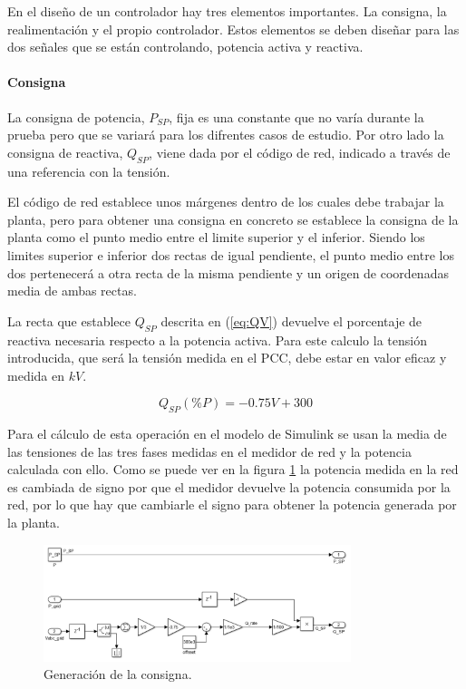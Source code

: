 \documentclass{book}
\begin{document}
En el diseño de un controlador hay tres elementos importantes. La consigna, la realimentaci\'on y el propio controlador. Estos elementos se deben diseñar para las dos señales que se est\'an controlando, potencia activa y reactiva. \par

		\paragraph{Consigna}

La consigna de potencia, $P_{SP}$, fija es una constante que no var\'ia durante la prueba pero que se variar\'a para los difrentes casos de estudio. Por otro lado la consigna de reactiva, $Q_{SP}$, viene dada por el c\'odigo de red, indicado a trav\'es de una referencia con la tensi\'on. \par

El c\'odigo de red establece unos m\'argenes dentro de los cuales debe trabajar la planta, pero para obtener una consigna en concreto se establece la consigna de la planta como el punto medio entre el limite superior y el inferior. Siendo los limites superior e inferior dos rectas de igual pendiente, el punto medio entre los dos pertenecer\'a a otra recta de la misma pendiente y un origen de coordenadas media de ambas rectas. \par

La recta que establece $Q_{SP}$ descrita en (\ref{eq:QV}) devuelve el porcentaje de reactiva necesaria respecto a la potencia activa. Para este calculo la tensi\'on introducida, que ser\'a la tensi\'on medida en el PCC, debe estar en valor eficaz y medida en $kV$.  

\begin{equation}\label{eq:QV}
	Q_{SP}(\%P)= -0.75V +300 
\end{equation} \par

Para el c\'alculo de esta operaci\'on en el modelo de Simulink se usan la media de las tensiones de las tres fases medidas en el medidor de red y la potencia calculada con ello. Como se puede ver en la figura \ref{SP_Sim} la potencia medida en la red es cambiada de signo por que el medidor devuelve la potencia consumida por la red, por lo que hay que cambiarle el signo para obtener la potencia generada por la planta. 

\begin{figure}[h!]
\centering
\includegraphics[width=0.8\textwidth]{SP_Sim.PNG}
\caption{Generaci\'on de la consigna. }
\label{SP_Sim}
\end{figure} \par
\end{document}
